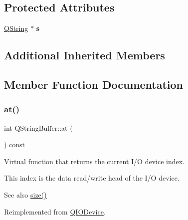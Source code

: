 \subsection*{Protected Attributes}
\begin{DoxyCompactItemize}
\item 
\mbox{\label{class_q_string_buffer_a04a03f7ce67b5cf129bb46b816b57450}} 
\mbox{\hyperlink{class_q_string}{Q\+String}} $\ast$ {\bfseries s}
\end{DoxyCompactItemize}
\subsection*{Additional Inherited Members}


\subsection{Member Function Documentation}
\mbox{\label{class_q_string_buffer_ad5305aacadba80e595b741142f67538e}} 
\subsubsection{\texorpdfstring{at()}{at()}\hspace{0.1cm}{\footnotesize\ttfamily [1/2]}}
{\footnotesize\ttfamily int Q\+String\+Buffer\+::at (\begin{DoxyParamCaption}{ }\end{DoxyParamCaption}) const\hspace{0.3cm}{\ttfamily [virtual]}}

Virtual function that returns the current I/O device index.

This index is the data read/write head of the I/O device.

\begin{DoxySeeAlso}{See also}
\mbox{\hyperlink{class_q_string_buffer_a914433284831ecca2b30f80a642d175e}{size()}} 
\end{DoxySeeAlso}


Reimplemented from \mbox{\hyperlink{class_q_i_o_device_a0dee1db4a9e506924ccac6982ffdf3df}{Q\+I\+O\+Device}}.

\mbox{\label{class_q_string_buffer_a36caaffb3e157196ce5201f0f7c9fa25}} 
